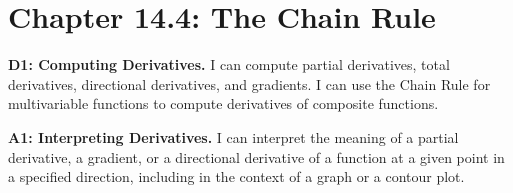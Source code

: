 
\fancyhead[R]{\dayten}

\section*{\centering Chapter 14.4: The Chain Rule}

\textbf{D1: Computing Derivatives.} I can compute partial derivatives, total derivatives, directional derivatives, and gradients. I can use the Chain Rule for multivariable functions to compute derivatives of composite functions.

\textbf{A1: Interpreting Derivatives.} I can interpret the meaning of a partial derivative, a gradient, or a directional derivative of a function at a given point in a specified direction, including in the context of a graph or a contour plot.


